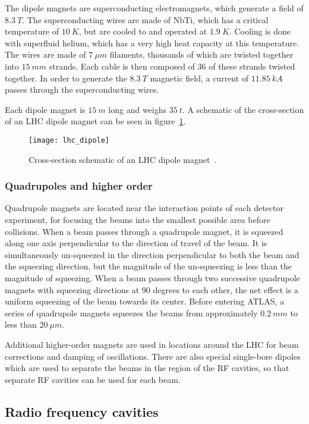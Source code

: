 The dipole magnets are superconducting electromagnets, which generate a field of $8.3~T$.
The superconducting wires are made of $\mathrm{NbTi}$, which has a critical temperature of $10~K$,
but are cooled to and operated at $1.9~K$.
Cooling is done with superfluid helium, which has a very high heat capacity at this temperature.
The wires are made of $7~\mu m$ filaments, thousands of which are twisted together into $15~mm$ strands.
Each cable is then composed of 36 of these strands twisted together.
In order to generate the $8.3~T$ magnetic field, a current of $11.85~kA$ passes through the superconducting wires.

Each dipole magnet is $15~m$ long and weighs $35~t$.
A schematic of the cross-section of an LHC dipole magnet can be seen in figure~\ref{fig:lhc_dipole}.

\begin{figure}[!ht]\centering
\texttt{[image: lhc\_dipole]}
\caption{Cross-section schematic of an LHC dipole magnet~\cite{lhc-dipole}.}
\label{fig:lhc_dipole}
\end{figure}

\subsubsection{Quadrupoles and higher order}

Quadrupole magnets are located near the interaction points of each detector experiment,
for focusing the beams into the smallest possible area before collisions.
When a beam passes through a quadrupole magnet, it is squeezed along one axis perpendicular to the direction of travel of the beam.
It is simultaneously un-squeezed in the direction perpendicular to both the beam and the squeezing direction,
but the magnitude of the un-squeezing is less than the magnitude of squeezing.
When a beam passes through two successive quadrupole magnets with squeezing directions at 90 degrees to each other,
the net effect is a uniform squeezing of the beam towards its center.
Before entering ATLAS, a series of quadrupole magnets squeezes the beams from approximately $0.2~mm$ to less than $20~\mu m$.

Additional higher-order magnets are used in locations around the LHC for beam corrections and damping of oscillations.
There are also special single-bore dipoles which are used to separate the beams in the region of the RF cavities,
so that separate RF cavities can be used for each beam.

\subsection{Radio frequency cavities}\label{subsec:lhc_rf}

